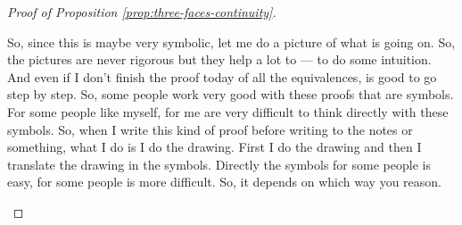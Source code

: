 \begin{proof}[Proof of Proposition \ref{prop:three-faces-continuity}]
\begin{spoken-clean}[00:19:50 - 00:21:15]
So, since this is maybe very symbolic, let me do a picture of what is going on. So, the pictures are never rigorous but they help a lot to --- to do some intuition. And even if I don't finish the proof today of all the equivalences, is good to go step by step. So, some people work very good with these proofs that are symbols. For some people like myself, for me are very difficult to think directly with these symbols. So, when I write this kind of proof before writing to the notes or something, what I do is I do the drawing. First I do the drawing and then I translate the drawing in the symbols. Directly the symbols for some people is easy, for some people is more difficult. So, it depends on which way you reason.
\end{spoken-clean}

\begin{math-stroke}
\begin{center}
\end{center}
\end{math-stroke}
\end{proof}
